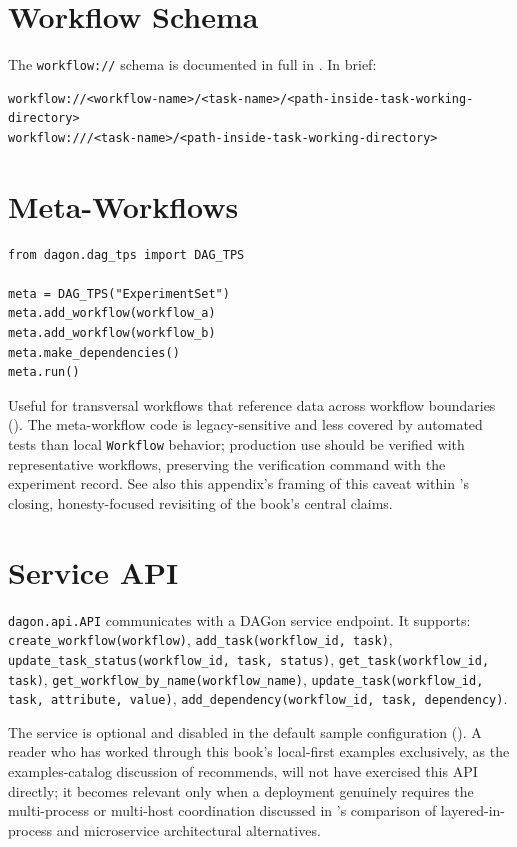 \section{Workflow Schema}

The \texttt{workflow://} schema is documented in full in .
In brief:

\begin{lstlisting}
workflow://<workflow-name>/<task-name>/<path-inside-task-working-directory>
workflow:///<task-name>/<path-inside-task-working-directory>
\end{lstlisting}

\section{Meta-Workflows}

\begin{lstlisting}
from dagon.dag_tps import DAG_TPS

meta = DAG_TPS("ExperimentSet")
meta.add_workflow(workflow_a)
meta.add_workflow(workflow_b)
meta.make_dependencies()
meta.run()
\end{lstlisting}

Useful for transversal workflows that reference data across workflow
boundaries (). The meta-workflow code is
legacy-sensitive and less covered by automated tests than local
\texttt{Workflow} behavior; production use should be verified with
representative workflows, preserving the verification command with the
experiment record. See also this appendix's framing of this caveat within
's closing, honesty-focused revisiting of the book's
central claims.

\section{Service API}

\texttt{dagon.api.API} communicates with a DAGon service endpoint. It
supports: \texttt{create\_workflow(workflow)},
\texttt{add\_task(workflow\_id, task)},
\texttt{update\_task\_status(workflow\_id, task, status)},
\texttt{get\_task(workflow\_id, task)},
\texttt{get\_workflow\_by\_name(workflow\_name)},
\texttt{update\_task(workflow\_id, task, attribute, value)},
\texttt{add\_dependency(workflow\_id, task, dependency)}.

The service is optional and disabled in the default sample configuration
(). A reader who has worked through this
book's local-first examples exclusively, as the examples-catalog discussion
of  recommends, will not have exercised this API
directly; it becomes relevant only when a deployment genuinely requires the
multi-process or multi-host coordination discussed in
's comparison of layered-in-process and microservice
architectural alternatives.
